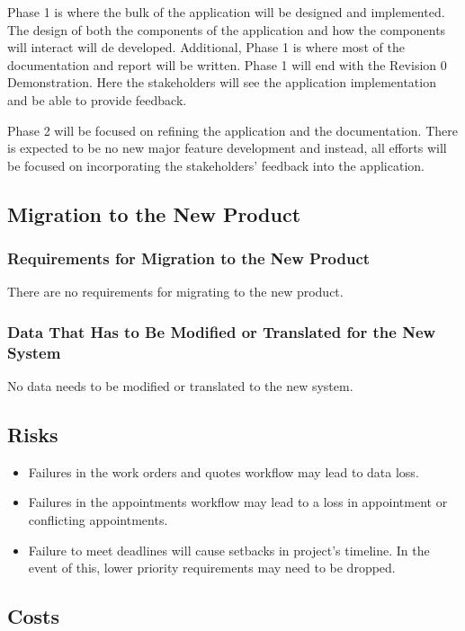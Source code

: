 \documentclass[12pt]{article}
\begin{document}
Phase 1 is where the bulk of the application will be designed and implemented. The design of both
the components of the application and how the components will interact will de developed.
Additional, Phase 1 is where most of the documentation and report will be written. Phase 1 will end
with the Revision 0 Demonstration. Here the stakeholders will see the application implementation
and be able to provide feedback.

Phase 2 will be focused on refining the application and the documentation. There is expected to be
no new major feature development and instead, all efforts will be focused on incorporating the
stakeholders' feedback into the application.

\subsection{Migration to the New Product}
\subsubsection{Requirements for Migration to the New Product}

There are no requirements for migrating to the new product.

\subsubsection{Data That Has to Be Modified or Translated for the New System}

No data needs to be modified or translated to the new system.

\subsection{Risks}

\begin{itemize}
	\item Failures in the work orders and quotes workflow may lead to data loss.
	\item Failures in the appointments workflow may lead to a loss in appointment or conflicting
	      appointments.
	\item Failure to meet deadlines will cause setbacks in project's timeline. In the event of this, lower
	      priority requirements may need to be dropped.
\end{itemize}

\subsection{Costs}
\end{document}

